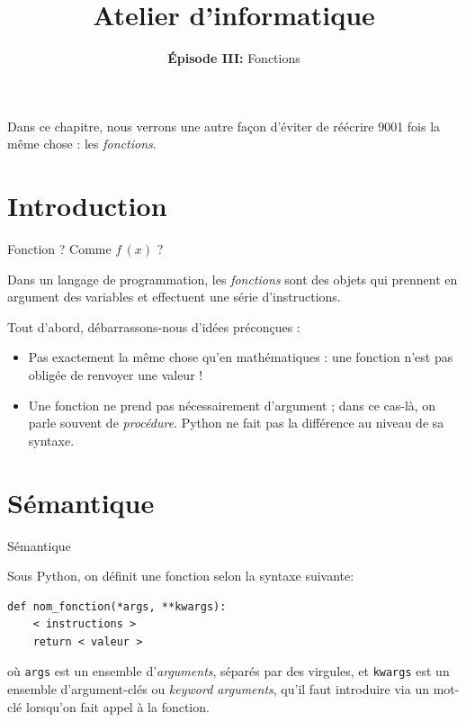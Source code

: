 \documentclass[10pt]{beamer}
\title{Atelier d'informatique}
\subtitle{\textbf{Épisode III:} Fonctions}
\begin{document}
\begin{frame}
\titlepage
\pause

Dans ce chapitre, nous verrons une autre façon d'éviter de réécrire 9001 fois la même chose : les \textit{fonctions}.
\end{frame}

\frame{\tableofcontents}

\section{Introduction}

\begin{frame}[fragile]{Fonction ? Comme $f\,(x)$ ?}

Dans un langage de programmation, les \textit{fonctions} sont des objets qui prennent en argument des variables et effectuent une série d'instructions.
\pause
\vspace{1em}

Tout d'abord, débarrassons-nous d'idées préconçues :
\pause

\begin{itemize}[<+->]
\item Pas exactement la même chose qu'en mathématiques : une fonction n'est pas obligée de renvoyer une valeur !
\item Une fonction ne prend pas nécessairement d'argument ; dans ce cas-là, on parle souvent de \textit{procédure}. Python ne fait pas la différence au niveau de sa syntaxe.
\end{itemize}

\end{frame}

\section{Sémantique}

\begin{frame}[fragile]{Sémantique}

Sous Python, on définit une fonction selon la syntaxe suivante:\pause
\begin{lstlisting}def nom_fonction(*args, **kwargs):
    < instructions >
    return < valeur >\end{lstlisting}
\pause
où \lstinline|args| est un ensemble d'\textit{arguments}, séparés par des virgules, et \lstinline|kwargs| est un ensemble d'argument-clés ou \textit{keyword arguments}, qu'il faut introduire via un mot-clé lorsqu'on fait appel à la fonction.
\end{frame}
\end{document}
